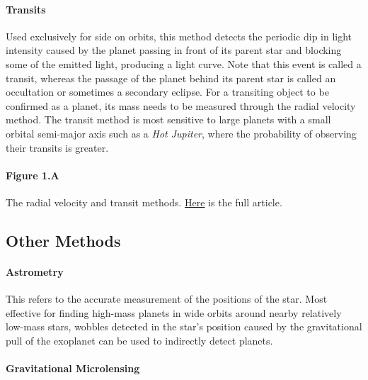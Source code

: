 \documentclass[11pt]{article}
\begin{document}
\hypertarget{transits}{%
\paragraph{Transits}\label{transits}}

Used exclusively for side on orbits, this method detects the periodic
dip in light intensity caused by the planet passing in front of its
parent star and blocking some of the emitted light, producing a light
curve. Note that this event is called a transit, whereas the passage of
the planet behind its parent star is called an occultation or sometimes
a secondary eclipse. For a transiting object to be confirmed as a
planet, its mass needs to be measured through the radial velocity
method. The transit method is most sensitive to large planets with a
small orbital semi-major axis such as a \emph{Hot Jupiter}, where the
probability of observing their transits is greater.

    \hypertarget{figure-1.a}{%
\paragraph{Figure 1.A}\label{figure-1.a}}

The radial velocity and transit methods.
\href{https://www.economist.com/graphic-detail/2016/08/25/how-to-find-exoplanets}{Here}
is the full article.

    \hypertarget{other-methods}{%
\subsection{Other Methods}\label{other-methods}}

\hypertarget{astrometry}{%
\paragraph{Astrometry}\label{astrometry}}

This refers to the accurate measurement of the positions of the star.
Most effective for finding high-mass planets in wide orbits around
nearby relatively low-mass stars, wobbles detected in the star's
position caused by the gravitational pull of the exoplanet can be used
to indirectly detect planets.

\hypertarget{gravitational-microlensing}{%
\paragraph{Gravitational Microlensing}\label{gravitational-microlensing}}
\end{document}
